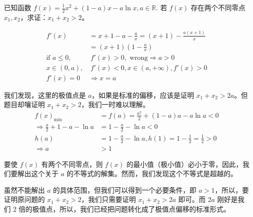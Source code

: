 \begin{example}
    已知函数 $f(x) = \frac{1}{2}x^2 + (1-a)x - a\ln x, a \in \mathbb{R}$.
若 $f(x)$ 存在两个不同零点 $x_1, x_2$，求证：$x_1 + x_2 > 2$。
\end{example}
\begin{jie}
    \begin{align*}
        f'(x) &= x + 1 - a - \frac{a}{x} = (x + 1) - \frac{a(x + 1)}{x} \\
        &= (x + 1)\left(1 - \frac{a}{x}\right) \\
        \text{if } a \leqslant 0, & \ f'(x) > 0, \text{ wrong} \Rightarrow a > 0 \\
        x \in (0, a), & \ f'(x) < 0, x \in (a, +\infty), f'(x) > 0 \\
        f'(x) = 0 & \Rightarrow x = a
        \end{align*}
        
        我们发现，这里的极值点是 $a$，如果是标准的偏移，应该是证明 $x_1 + x_2 > 2a$。但题目却嚷证明 $x_1 + x_2 > 2$，我们一时难以理解。
        \begin{align*}
            f(x)_{\min} &= f(a) = \frac{a^2}{2} + (1-a)a - a\ln a < 0 \\
            \Rightarrow \frac{a}{2} + 1 - a - \ln a &= 1 - \frac{a}{2} - \ln a < 0 \\
            h(a) &= 1 - \frac{a}{2} - \ln a, h(1) = 1 - \frac{1}{2} = \frac{1}{2} > 0 \\
            \Rightarrow a &> 1
            \end{align*}
            
            要使 $f(x)$ 有两个不同零点，则 $f(x)$ 的最小值（极小值）必小于零，因此，我们要解出这个关于 $a$ 的不等式的解集。然而，我们发现这个不等式是超越的。
            
            虽然不能解出 $a$ 的具体范围，但我们可以得到一个必要条件，即 $a > 1$，所以，要证明原问题的 $x_1 + x_2 > 2$，我们只需要证明 $x_1 + x_2 > 2a$ 即可。而 $2a$ 刚好是我们 2 倍的极值点，所以，我们已经把问题转化成了极值点偏移的标准形式。
            

\end{jie}
